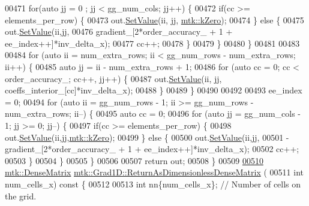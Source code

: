 \begin{DoxyCode}
{{00471     \textcolor{keywordflow}{for}(\textcolor{keyword}{auto} jj = 0 ; jj < gg\_num\_cols; jj++) \{
00472       \textcolor{keywordflow}{if}(cc >= elements\_per\_row) \{
00473         out.\hyperlink{classmtk_1_1DenseMatrix_a784ce5784109ac86bfb9d8562b334b13}{SetValue}(ii, jj, \hyperlink{group__c01-roots_ga59a451a5fae30d59649bcda274fea271}{mtk::kZero});
00474       \} \textcolor{keywordflow}{else} \{
00475         out.\hyperlink{classmtk_1_1DenseMatrix_a784ce5784109ac86bfb9d8562b334b13}{SetValue}(ii,jj,
00476                      gradient\_[2*order\_accuracy\_ + 1 + ee\_index++]*inv\_delta\_x);
00477         cc++;
00478       \}
00479     \}
00480   \}
00481 
00483 
00484   \textcolor{keywordflow}{for} (\textcolor{keyword}{auto} ii = num\_extra\_rows; ii < gg\_num\_rows - num\_extra\_rows; ii++) \{
00485     \textcolor{keyword}{auto} jj = ii - num\_extra\_rows + 1;
00486     \textcolor{keywordflow}{for} (\textcolor{keyword}{auto} cc = 0; cc < order\_accuracy\_; cc++, jj++) \{
00487       out.\hyperlink{classmtk_1_1DenseMatrix_a784ce5784109ac86bfb9d8562b334b13}{SetValue}(ii, jj, coeffs\_interior\_[cc]*inv\_delta\_x);
00488     \}
00489   \}
00490 
00492 
00493   ee\_index = 0;
00494   \textcolor{keywordflow}{for} (\textcolor{keyword}{auto} ii = gg\_num\_rows - 1; ii >= gg\_num\_rows - num\_extra\_rows; ii--) \{
00495     \textcolor{keyword}{auto} cc = 0;
00496     \textcolor{keywordflow}{for} (\textcolor{keyword}{auto} jj = gg\_num\_cols - 1; jj >= 0; jj--) \{
00497       \textcolor{keywordflow}{if}(cc >= elements\_per\_row) \{
00498         out.\hyperlink{classmtk_1_1DenseMatrix_a784ce5784109ac86bfb9d8562b334b13}{SetValue}(ii,jj,\hyperlink{group__c01-roots_ga59a451a5fae30d59649bcda274fea271}{mtk::kZero});
00499       \} \textcolor{keywordflow}{else} \{
00500         out.\hyperlink{classmtk_1_1DenseMatrix_a784ce5784109ac86bfb9d8562b334b13}{SetValue}(ii,jj,
00501                     -gradient\_[2*order\_accuracy\_ + 1 + ee\_index++]*inv\_delta\_x);
00502         cc++;
00503       \}
00504      \}
00505   \}
00506 
00507   \textcolor{keywordflow}{return} out;
00508 \}
00509 
\hypertarget{mtk__grad__1d_8cc_source_l00510}{}\hyperlink{classmtk_1_1Grad1D_ab07e6a15edca32534ae3d1a8ccaf1c42}{00510} \hyperlink{classmtk_1_1DenseMatrix}{mtk::DenseMatrix} \hyperlink{classmtk_1_1Grad1D_ab07e6a15edca32534ae3d1a8ccaf1c42}{mtk::Grad1D::ReturnAsDimensionlessDenseMatrix}
      (
00511   \textcolor{keywordtype}{int} num\_cells\_x)\textcolor{keyword}{ const }\{
00512 
00513   \textcolor{keywordtype}{int} nn\{num\_cells\_x\}; \textcolor{comment}{// Number of cells on the grid.}
}}
\end{DoxyCode}
